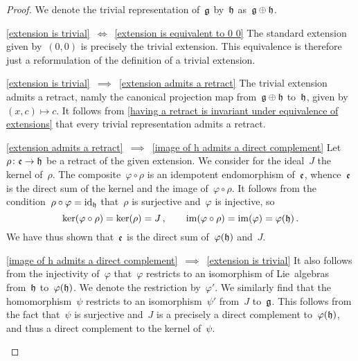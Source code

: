 \begin{proof}
	We denote the trivial representation of~$\mathfrak{g}$ by~$\mathfrak{h}$ as~$\mathfrak{g} \oplus \mathfrak{h}$.
	\begin{implicationlist}
		\item[\ref{extension is trivial}~$\iff$~\ref{extension is equivalent to 0 0}]
			The standard extension given by~$(0,0)$ is precisely the trivial extension.
			This equivalence is therefore just a reformulation of the definition of a trivial extension.
		\item[\ref{extension is trivial}~$\implies$~\ref{extension admits a retract}]
			The trivial extension admits a retract, namly the canonical projection map from~$\mathfrak{g} \oplus \mathfrak{h}$ to~$\mathfrak{h}$, given by~$(x,c) \mapsto c$.
			It follows from \cref{having a retract is invariant under equivalence of extensions} that every trivial representation admits a retract.
		\item[\ref{extension admits a retract}~$\implies$~\ref{image of h admits a direct complement}]
			Let~$\rho \colon \elie \to \hlie$ be a retract of the given extension.
			We consider for the ideal~$J$ the kernel of~$\rho$.
			The composite~$\varphi \circ \rho$ is an idempotent endomorphism of~$\mathfrak{e}$, whence~$\mathfrak{e}$ is the direct sum of the kernel and the image of~$\varphi \circ \rho$.
			It follows from the condition~$\rho \circ \varphi = \mathrm{id}_{\mathfrak{h}}$ that~$\rho$ is surjective and~$\varphi$ is injective, so
			\[
				\ker(\varphi \circ \rho) = \ker(\rho) = J \,,
				\qquad
				\operatorname{im}(\varphi \circ \rho) = \operatorname{im}(\varphi) = \varphi(\mathfrak{h}) \,.
			\]
			We have thus shown that~$\mathfrak{e}$ is the direct sum of~$\varphi(\mathfrak{h})$ and~$J$.
		\item[\ref{image of h admits a direct complement}~$\implies$~\ref{extension is trivial}]
			It also follows from the injectivity of~$\varphi$ that~$\varphi$ restricts to an isomorphism of Lie~algebras from~$\mathfrak{h}$ to~$\varphi(\mathfrak{h})$.
			We denote the restriction by~$\varphi'$.
			We similarly find that the homomorphism~$\psi$ restricts to an isomorphism~$\psi'$ from~$J$ to~$\mathfrak{g}$.
			This follows from the fact that~$\psi$ is surjective and~$J$ is a precisely a direct complement to~$\varphi(\mathfrak{h})$, and thus a direct complement to the kernel of~$\psi$.


\end{implicationlist}
\end{proof}
